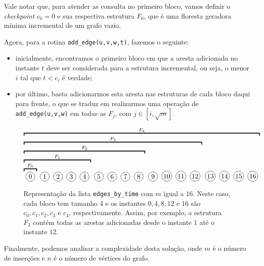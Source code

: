 Vale notar que, para atender as consulta no primeiro bloco, vamos definir o \emph{checkpoint} $c_0 = 0$ e sua respectiva estrutura $F_0$, que é uma floresta geradora mínima incremental de um grafo vazio.

Agora, para a rotina \texttt{add\_edge(u,v,w,t)}, fazemos o seguinte:

\begin{itemize}
    \item inicialmente, encontramos o primeiro bloco em que a aresta adicionada no instante $t$ deve ser considerada para a estrutura incremental, ou seja, o menor $i$ tal que $t < c_i$ é verdade;
    \item por último, basta adicionarmos esta aresta nas estruturas de cada bloco daqui para frente, o que se traduz em realizarmos uma operação de \texttt{add\_edge(u,v,w)} em todas as $F_j$, com $j \in [i, \sqrt{m}]$.
\end{itemize}

\begin{figure}
    \centering
    \begin{equation*}
        \overbracket{
            \overbracket{
                \overbracket{
                    \overbracket{
                        \overbracket{
                            \bolinha{\,0\,}
                        }^{F_0}
                        \bolinha{\,1\,}
                        \bolinha{\,2\,}
                        \bolinha{\,3\,}
                        \bolinha{\,4\,}
                    }^{F_1}
                    \bolinha{\,5\,}
                    \bolinha{\,6\,}
                    \bolinha{\,7\,}
                    \bolinha{\,8\,}
                }^{F_2}
                \bolinha{\,9\,}
                \bolinha{10}
                \bolinha{11}
                \bolinha{12}
            }^{F_3}
            \bolinha{13}
            \bolinha{14}
            \bolinha{15}
            \bolinha{16}
        }^{F_4}
    \end{equation*}
    \caption{Representação da lista \texttt{edges\_by\_time} com $m$ igual a $16$. Neste caso, cada bloco tem tamanho $4$ e os instantes $0,4,8,12$ e $16$ são $c_0, c_1, c_2, c_3$ e $c_4$, respectivamente. Assim, por exemplo, a estrutura $F_3$ contém todas as arestas adicionadas desde o instante $1$ até o instante $12$.}
    \label{fig:sqrt-decomp-blocks-m16}
\end{figure}

Finalmente, podemos analisar a complexidade desta solução, onde $m$ é o número de inserções e $n$ é o número de vértices do grafo.


